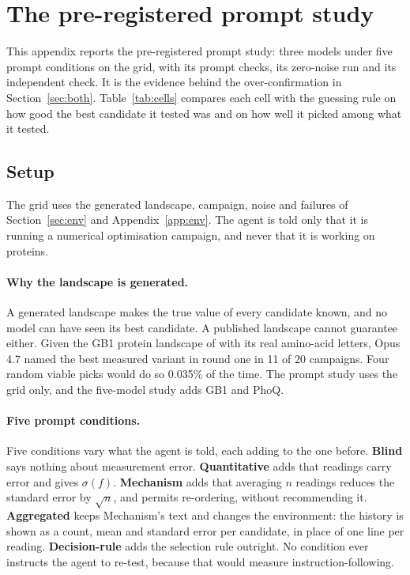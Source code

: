 \section{The pre-registered prompt study}
\label{app:grid}

This appendix reports the pre-registered prompt study: three models under five prompt conditions on the
grid, with its prompt checks, its zero-noise run and its independent check. It is the evidence behind
the over-confirmation in Section~\ref{sec:both}. Table~\ref{tab:cells} compares each cell with the guessing rule on
how good the best candidate it tested was and on how well it picked among what it tested.

\subsection{Setup}
\label{sec:envgrid}
\label{sec:design}

The grid uses the generated landscape, campaign, noise and failures of Section~\ref{sec:env} and
Appendix~\ref{app:env}. The agent is told only that it is running a numerical optimisation campaign, and never that
it is working on proteins.

\paragraph{Why the landscape is generated.} A generated landscape makes the true value of every candidate
known, and no model can have seen its best candidate. A published landscape cannot guarantee either. Given the GB1
protein landscape of \citet{wu2016adaptation} with its real amino-acid letters, Opus 4.7 named the best
measured variant in round one in 11 of 20 campaigns. Four random viable picks would do so 0.035\% of the
time. The prompt study uses the grid only, and the five-model study adds GB1 and PhoQ.

\paragraph{Five prompt conditions.} Five conditions vary what the agent is told, each adding to the one
before. \textbf{Blind} says nothing about measurement error. \textbf{Quantitative} adds that readings carry
error and gives $\sigma(f)$. \textbf{Mechanism} adds that averaging $n$ readings reduces the standard error
by $\sqrt{n}$, and permits re-ordering, without recommending it. \textbf{Aggregated} keeps Mechanism's text
and changes the environment: the history is shown as a count, mean and standard error per
candidate, in place of one line per reading. \textbf{Decision-rule} adds the selection rule outright. No
condition ever instructs the agent to re-test, because that would measure instruction-following.

